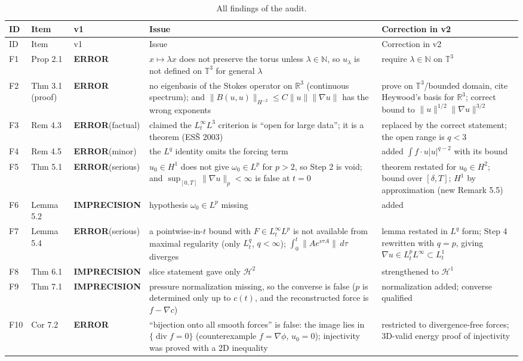 \documentclass[11pt,a4paper]{article}
\newcommand{\ERR}{\textcolor{err}{\textbf{ERROR}}}
\newcommand{\IMP}{\textcolor{imp}{\textbf{IMPRECISION}}}
\newcommand{\R}{\mathbb{R}}
\newcommand{\T}{\mathbb{T}}
\begin{document}
{\small
\begin{longtable}{@{}p{0.45cm}p{2.85cm}p{1.7cm}p{6.5cm}p{5.7cm}@{}}
\caption{All findings of the audit.}\label{tab:findings}\\
\toprule
ID & Item & v1 & Issue & Correction in v2\\
\midrule
\endfirsthead
\toprule
ID & Item & v1 & Issue & Correction in v2\\
\midrule
\endhead
\bottomrule
\endfoot
F1 & Prop 2.1 & \ERR & $x\mapsto\lambda x$ does not preserve the torus unless $\lambda\in\mathbb N$, so $u_\lambda$ is not defined on $\T^3$ for general $\lambda$ & require $\lambda\in\mathbb N$ on $\T^3$\\
F2 & Thm 3.1 (proof) & \ERR & no eigenbasis of the Stokes operator on $\R^3$ (continuous spectrum); and $\|B(u,u)\|_{H^{-2}}\le C\|u\|\|\nabla u\|$ has the wrong exponents & prove on $\T^3$/bounded domain, cite Heywood's basis for $\R^3$; correct bound to $\|u\|^{1/2}\|\nabla u\|^{3/2}$\\
F3 & Rem 4.3 & \ERR (factual) & claimed the $L^\infty_tL^3$ criterion is ``open for large data''; it is a theorem (ES\v{S} 2003) & replaced by the correct statement; the open range is $q<3$\\
F4 & Rem 4.5 & \ERR (minor) & the $L^q$ identity omits the forcing term & added $\int f\cdot u|u|^{q-2}$ with its bound\\
F5 & Thm 5.1 & \ERR (serious) & $u_0\in H^1$ does not give $\omega_0\in L^p$ for $p>2$, so Step 2 is void; and $\sup_{[0,T]}\|\nabla u\|_p<\infty$ is false at $t=0$ & theorem restated for $u_0\in H^2$; bound over $[\delta,T]$; $H^1$ by approximation (new Remark 5.5)\\
F6 & Lemma 5.2 & \IMP & hypothesis $\omega_0\in L^p$ missing & added\\
F7 & Lemma 5.4 & \ERR (serious) & a pointwise-in-$t$ bound with $F\in L^\infty_tL^p$ is not available from maximal regularity (only $L^q_t$, $q<\infty$); $\int_0^t\|Ae^{\nu\tau A}\|\,d\tau$ diverges & lemma restated in $L^q$ form; Step 4 rewritten with $q=p$, giving $\nabla u\in L^p_tL^\infty\subset L^1_t$\\
F8 & Thm 6.1 & \IMP & slice statement gave only $\mathcal H^2$ & strengthened to $\mathcal H^1$\\
F9 & Thm 7.1 & \IMP & pressure normalization missing, so the converse is false ($p$ is determined only up to $c(t)$, and the reconstructed force is $f-\nabla c$) & normalization added; converse qualified\\
F10 & Cor 7.2 & \ERR & ``bijection onto all smooth forces'' is false: the image lies in $\{\operatorname{div}f=0\}$ (counterexample $f=\nabla\phi$, $u_0=0$); injectivity was proved with a 2D inequality & restricted to divergence-free forces; 3D-valid energy proof of injectivity\\

\end{longtable}}
\end{document}
